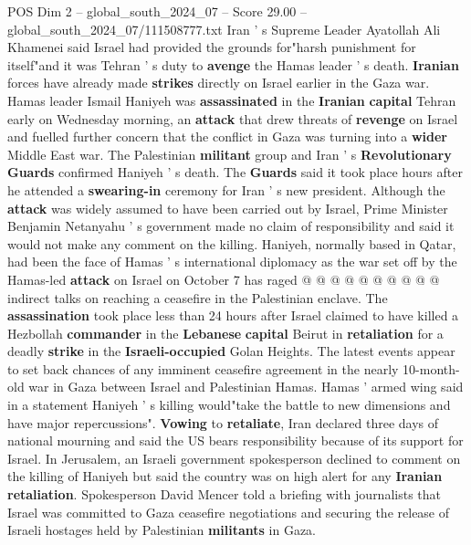 \begin{textsample}{POS Dim 2 – global\_south\_2024\_07 – Score 29.00 – global\_south\_2024\_07/111508777.txt}  \label{ex:f2_pos_061}
Iran ' s Supreme Leader Ayatollah Ali Khamenei said Israel had provided the grounds for"harsh punishment for itself"and it was Tehran ' s duty to \textbf{avenge} the Hamas leader ' s death. \textbf{Iranian} forces have already made \textbf{strikes} directly on Israel earlier in the Gaza war.
Hamas leader Ismail Haniyeh was \textbf{assassinated} in the \textbf{Iranian} \textbf{capital} Tehran early on Wednesday morning, an \textbf{attack} that drew threats of \textbf{revenge} on Israel and fuelled further concern that the conflict in Gaza was turning into a \textbf{wider} Middle East war.
The Palestinian \textbf{militant} group and Iran ' s \textbf{Revolutionary} \textbf{Guards} confirmed Haniyeh ' s death.
The \textbf{Guards} said it took place hours after he attended a \textbf{swearing-in} ceremony for Iran ' s new president.
Although the \textbf{attack} was widely assumed to have been carried out by Israel, Prime Minister Benjamin Netanyahu ' s government made no claim of responsibility and said it would not make any comment on the killing.
Haniyeh, normally based in Qatar, had been the face of Hamas ' s international diplomacy as the war set off by the Hamas-led \textbf{attack} on Israel on October 7 has raged @ @ @ @ @ @ @ @ @ @ indirect talks on reaching a ceasefire in the Palestinian enclave.
The \textbf{assassination} took place less than 24 hours after Israel claimed to have killed a Hezbollah \textbf{commander} in the \textbf{Lebanese} \textbf{capital} Beirut in \textbf{retaliation} for a deadly \textbf{strike} in the \textbf{Israeli-occupied} Golan Heights.
The latest events appear to set back chances of any imminent ceasefire agreement in the nearly 10-month-old war in Gaza between Israel and Palestinian Hamas.
Hamas ' armed wing said in a statement Haniyeh ' s killing would"take the battle to new dimensions and have major repercussions". \textbf{Vowing} to \textbf{retaliate}, Iran declared three days of national mourning and said the US bears responsibility because of its support for Israel.
In Jerusalem, an Israeli government spokesperson declined to comment on the killing of Haniyeh but said the country was on high alert for any \textbf{Iranian} \textbf{retaliation}.
Spokesperson David Mencer told a briefing with journalists that Israel was committed to Gaza ceasefire negotiations and securing the release of Israeli hostages held by Palestinian \textbf{militants} in Gaza.

\end{textsample}
